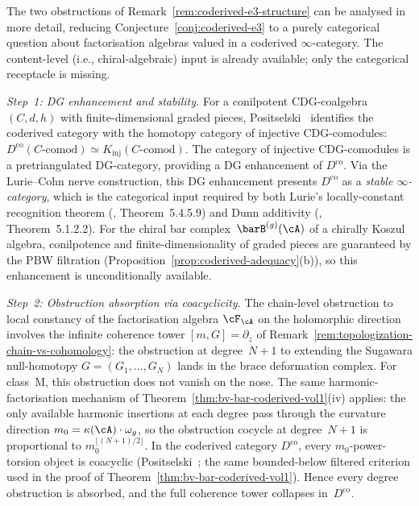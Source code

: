 \begin{remark}
\label{rem:coderived-e3-obstruction-analysis}%
%
%
The two obstructions of Remark~\ref{rem:coderived-e3-structure}
can be analysed in more detail, reducing
Conjecture~\ref{conj:coderived-e3} to a purely categorical
question about factorisation algebras valued in a coderived
$\infty$-category.
The content-level (i.e., chiral-algebraic) input is already
available; only the categorical receptacle is missing.

\emph{Step~1: DG enhancement and stability.}
For a conilpotent CDG-coalgebra~$(C,d,h)$ with finite-dimensional
graded pieces,
Positselski~\cite[Theorem~5.3, Corollary~4.4]{Positselski11}
identifies the coderived category with the homotopy category of
injective CDG-comodules:
$D^{\mathrm{co}}(C\text{-}\mathrm{comod})
\simeq K_{\mathrm{inj}}(C\text{-}\mathrm{comod})$.
The category of injective CDG-comodules is a pretriangulated
DG-category, providing a DG enhancement of
$D^{\mathrm{co}}$.
Via the Lurie--Cohn nerve construction, this DG enhancement
presents $D^{\mathrm{co}}$ as a \emph{stable $\infty$-category},
which is the categorical input required by both Lurie's
locally-constant recognition theorem
(\cite{HA}, Theorem~5.4.5.9) and
Dunn additivity (\cite{HA}, Theorem~5.1.2.2).
For the chiral bar complex~$\barB^{(g)}(\cA)$ of a chirally
Koszul algebra, conilpotence and finite-dimensionality of graded
pieces are guaranteed by the PBW filtration
(Proposition~\ref{prop:coderived-adequacy}(b)), so this
enhancement is unconditionally available.

\emph{Step~2: Obstruction absorption via coacyclicity.}
The chain-level obstruction to local constancy of the factorisation
algebra $\cF_\cA$ on the holomorphic direction involves
the infinite coherence tower
$[m, G] = \partial_z$ of
Remark~\ref{rem:topologization-chain-vs-cohomology}: the
obstruction at degree~$N{+}1$ to extending the Sugawara
null-homotopy $G = (G_1, \ldots, G_N)$ lands in the brace
deformation complex. For class~M, this obstruction
does not vanish on the nose.
The same harmonic-factorisation mechanism of
Theorem~\ref{thm:bv-bar-coderived-vol1}(iv)
applies: the only available harmonic insertions at each degree
pass through the curvature direction
$m_0 = \kappa(\cA) \cdot \omega_g$, so the obstruction cocycle
at degree~$N{+}1$ is proportional to
$m_0^{\lfloor (N+1)/2 \rfloor}$. In the coderived category
$D^{\mathrm{co}}$, every $m_0$-power-torsion object is
coacyclic
(Positselski~\cite[Proposition~3.5]{Positselski11}; the same
bounded-below filtered criterion used in the proof of
Theorem~\ref{thm:bv-bar-coderived-vol1}). Hence every degree
obstruction is absorbed, and the full coherence tower collapses
in~$D^{\mathrm{co}}$.


\end{remark}
